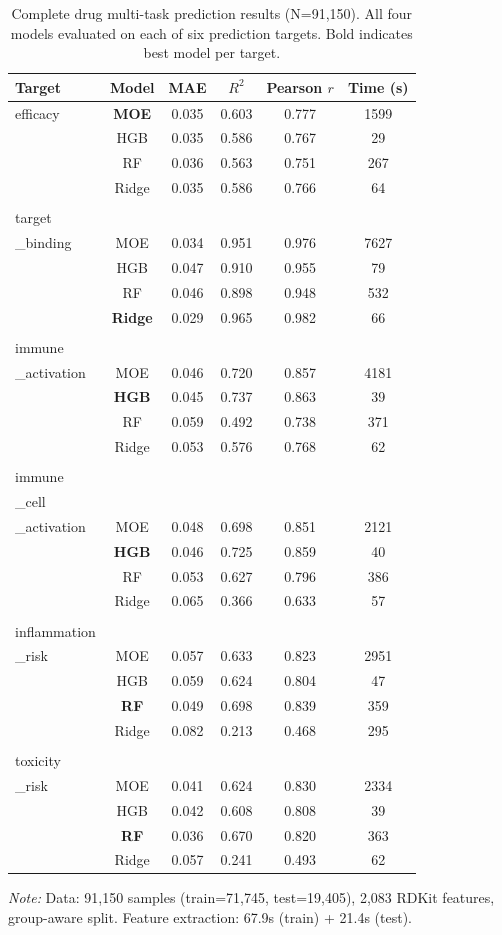 \begin{table}[htbp]
\centering
\caption{Complete drug multi-task prediction results (N=91,150). All four models evaluated on each of six prediction targets. Bold indicates best model per target.}
\label{tab:drug_all_targets}
\begin{tabular}{lccccc}
\toprule
Target & Model & MAE & $R^2$ & Pearson $r$ & Time (s) \\
\midrule
efficacy & \textbf{MOE} & 0.035 & 0.603 & 0.777 & 1599 \\
 & HGB & 0.035 & 0.586 & 0.767 & 29 \\
 & RF & 0.036 & 0.563 & 0.751 & 267 \\
 & Ridge & 0.035 & 0.586 & 0.766 & 64 \\
 &  &  &  &  &  \\
target\\_binding & MOE & 0.034 & 0.951 & 0.976 & 7627 \\
 & HGB & 0.047 & 0.910 & 0.955 & 79 \\
 & RF & 0.046 & 0.898 & 0.948 & 532 \\
 & \textbf{Ridge} & 0.029 & 0.965 & 0.982 & 66 \\
 &  &  &  &  &  \\
immune\\_activation & MOE & 0.046 & 0.720 & 0.857 & 4181 \\
 & \textbf{HGB} & 0.045 & 0.737 & 0.863 & 39 \\
 & RF & 0.059 & 0.492 & 0.738 & 371 \\
 & Ridge & 0.053 & 0.576 & 0.768 & 62 \\
 &  &  &  &  &  \\
immune\\_cell\\_activation & MOE & 0.048 & 0.698 & 0.851 & 2121 \\
 & \textbf{HGB} & 0.046 & 0.725 & 0.859 & 40 \\
 & RF & 0.053 & 0.627 & 0.796 & 386 \\
 & Ridge & 0.065 & 0.366 & 0.633 & 57 \\
 &  &  &  &  &  \\
inflammation\\_risk & MOE & 0.057 & 0.633 & 0.823 & 2951 \\
 & HGB & 0.059 & 0.624 & 0.804 & 47 \\
 & \textbf{RF} & 0.049 & 0.698 & 0.839 & 359 \\
 & Ridge & 0.082 & 0.213 & 0.468 & 295 \\
 &  &  &  &  &  \\
toxicity\\_risk & MOE & 0.041 & 0.624 & 0.830 & 2334 \\
 & HGB & 0.042 & 0.608 & 0.808 & 39 \\
 & \textbf{RF} & 0.036 & 0.670 & 0.820 & 363 \\
 & Ridge & 0.057 & 0.241 & 0.493 & 62 \\
\bottomrule
\end{tabular}
\footnotesize {\textit{Note:} Data: 91,150 samples (train=71,745, test=19,405), 2,083 RDKit features, group-aware split. Feature extraction: 67.9s (train) + 21.4s (test).}
\end{table}
